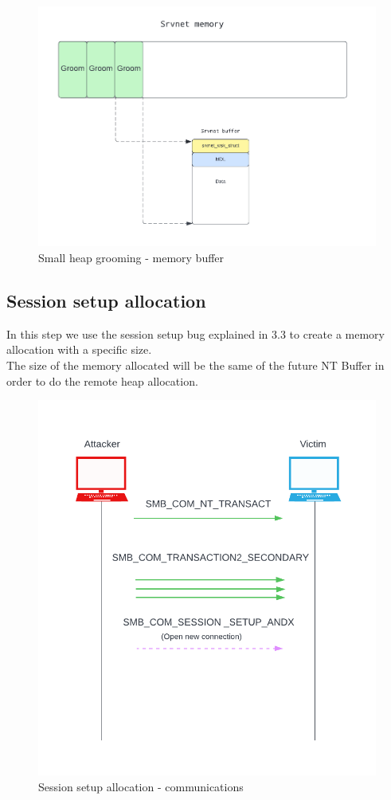 \begin{figure}[ht!]
    \centering
      \includegraphics[scale=0.5]{images/exploit_1_buff.png}
      \caption{Small heap grooming - memory buffer}
\end{figure}


\clearpage
\subsection{Session setup allocation}
In this step we use the session setup bug explained in 3.3 to create a memory allocation with a specific size\cite{eternalblue-analysis}.\\
The size of the memory allocated will be the same of the future NT Buffer in order to do the remote heap allocation.\\

\begin{figure}[ht!]
    \centering
      \includegraphics[scale=0.5]{images/exploit_2_comm.png}
      \caption{Session setup allocation - communications}
\end{figure}

